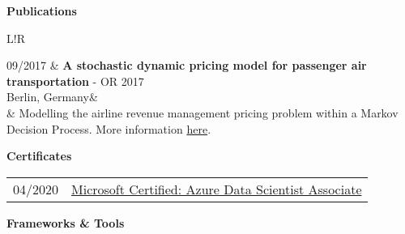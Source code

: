 \documentclass[a4paper, 12]{scrartcl}
\newcommand{\preSectionSpace}{\vspace{0.2cm}}
\newcommand{\afterSectionSpace}{\vspace{0.5cm}}
\newcommand\VRule{\color{lightgray}\vrule width 0.3pt}
\begin{document}
	
	\preSectionSpace
	\preSectionSpace
	\hspace{0.2cm}\large{\textcolor{mainColor}{\textbf{Publications}}}
	\afterSectionSpace
	
	\begin{tabular}{L!{\VRule}R}
		
		09/2017 & \textbf{A  stochastic  dynamic  pricing  model  for  passenger air transportation} - OR 2017\\
		\footnotesize{Berlin, Germany}&\\[-12pt]
		& Modelling the airline revenue management pricing problem within a Markov Decision Process. More information \href{https://www.euro-online.org/conf/admin/tmp/program-gor2017.pdf}{here}. \\[7pt]

	\end{tabular}
	
	\preSectionSpace
	\hspace{0.2cm}\large{\textcolor{mainColor}{\textbf{Certificates}}}
	\afterSectionSpace
	
	\begin{minipage}{0.3\textwidth}
		\begin{flushleft}
			\begin{tabular}{ll}
				04/2020 & \href{https://www.credly.com/badges/80d35358-f45f-4fa4-92d1-54f3289b488e?source=linked_in_profile}{Microsoft Certified: Azure Data Scientist Associate}
				\\
			\end{tabular}	
		\end{flushleft}
	\end{minipage}
	
	
	\preSectionSpace
	\hspace{0.2cm}\large{\textcolor{mainColor}{\textbf{Frameworks \& Tools}}}
	\afterSectionSpace
	
\end{document}
